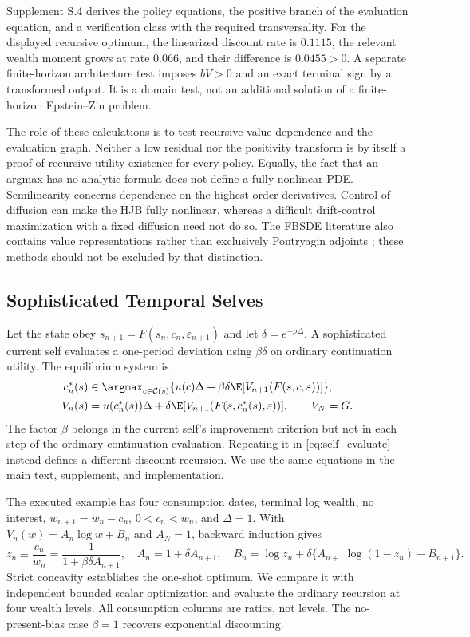 Supplement S.4 derives the policy equations, the positive branch of the evaluation equation, and a verification class with the required transversality. For the displayed recursive optimum, the linearized discount rate is $0.1115$, the relevant wealth moment grows at rate $0.066$, and their difference is $0.0455>0$. A separate finite-horizon architecture test imposes $bV>0$ and an exact terminal sign by a transformed output. It is a domain test, not an additional solution of a finite-horizon Epstein--Zin problem.

The role of these calculations is to test recursive value dependence and the evaluation graph. Neither a low residual nor the positivity transform is by itself a proof of recursive-utility existence for every policy. Equally, the fact that an argmax has no analytic formula does not define a fully nonlinear PDE. Semilinearity concerns dependence on the highest-order derivatives. Control of diffusion can make the HJB fully nonlinear, whereas a difficult drift-control maximization with a fixed diffusion need not do so. The FBSDE literature also contains value representations rather than exclusively Pontryagin adjoints \citep{han2018}; these methods should not be excluded by that distinction.

\subsection{Sophisticated Temporal Selves}
Let the state obey $s_{n+1}=F(s_n,c_n,\varepsilon_{n+1})$ and let $\delta=e^{-\rho\Delta}$. A sophisticated current self evaluates a one-period deviation using $\beta\delta$ on ordinary continuation utility. The equilibrium system is
\begin{align}
 c_n^*(s)&\in\argmax_{c\in\mathcal C(s)}
 \{u(c)\Delta+\beta\delta\E[V_{n+1}(F(s,c,\varepsilon))]\},\label{eq:self_improve}\\
 V_n(s)&=u(c_n^*(s))\Delta+\delta\E[V_{n+1}(F(s,c_n^*(s),\varepsilon))],
 \qquad V_N=G.
 \label{eq:self_evaluate}
\end{align}
The factor $\beta$ belongs in the current self's improvement criterion but not in each step of the ordinary continuation evaluation. Repeating it in \eqref{eq:self_evaluate} instead defines a different discount recursion. We use the same equations in the main text, supplement, and implementation.

The executed example has four consumption dates, terminal log wealth, no interest, $w_{n+1}=w_n-c_n$, $0<c_n<w_n$, and $\Delta=1$. With $V_n(w)=A_n\log w+B_n$ and $A_N=1$, backward induction gives
\begin{equation}
 z_n\equiv\frac{c_n}{w_n}=\frac{1}{1+\beta\delta A_{n+1}},\quad
 A_n=1+\delta A_{n+1},\quad
 B_n=\log z_n+\delta\{A_{n+1}\log(1-z_n)+B_{n+1}\}.
 \label{eq:self_closed_form}
\end{equation}
Strict concavity establishes the one-shot optimum. We compare it with independent bounded scalar optimization and evaluate the ordinary recursion at four wealth levels. All consumption columns are ratios, not levels. The no-present-bias case $\beta=1$ recovers exponential discounting.


